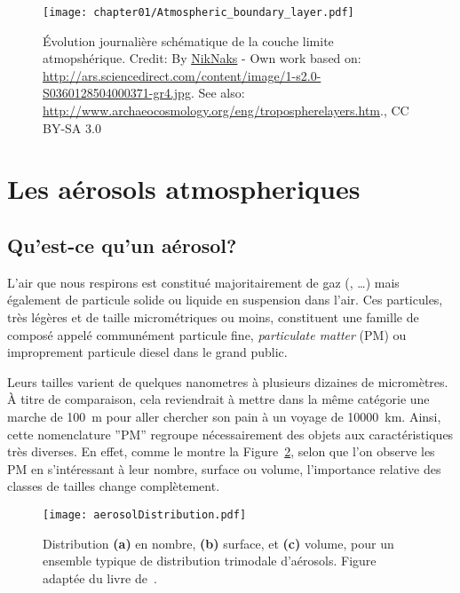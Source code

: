 \begin{figure}[h]
    \centering
    \texttt{[image: chapter01/Atmospheric\_boundary\_layer.pdf]}
    \caption{Évolution journalière schématique de la couche limite atmopshérique.
        Credit: By
        \href{https://commons.wikimedia.org/w/index.php?curid=18862904}{NikNaks} - Own
        work based on:
        \url{http://ars.sciencedirect.com/content/image/1-s2.0-S0360128504000371-gr4.jpg}.
        See also: \url{http://www.archaeocosmology.org/eng/tropospherelayers.htm}., CC
        BY-SA 3.0
    }%
    \label{fig:chapter01/Atmospheric_boundary_layer}
\end{figure}


\section{Les aérosols atmospheriques}%
\label{sec:les_aerosols_atmospheriques}

\subsection{Qu'est-ce qu'un aérosol?}%
\label{sub:quest-ce-quun-aerosol}

L'air que nous respirons est constitué majoritairement de gaz (, …) mais
également de particule solide ou liquide en suspension dans l'air. Ces particules, très
légères et de taille micrométriques ou moins, constituent une famille de composé appelé
communément particule fine, \textit{particulate matter} (PM) ou improprement particule
diesel dans le grand public.

Leurs tailles varient de quelques nanometres à plusieurs dizaines de micromètres.
À titre de comparaison, cela reviendrait à mettre dans la même catégorie une marche de
\SI{100}{m} pour aller chercher son pain à un voyage de \SI{10000}{km}.
Ainsi, cette nomenclature ''PM'' regroupe nécessairement des objets aux caractéristiques
très diverses. En effet, comme le montre la Figure~\ref{fig:aerosolDistribution}, selon
que l'on observe les PM en s'intéressant à leur nombre, surface ou volume, l'importance
relative des classes de tailles change complètement.
\begin{figure}[ht]
    \centering
    \texttt{[image: aerosolDistribution.pdf]}
    \caption{Distribution \textbf{(a)} en nombre, \textbf{(b)} surface, et
        \textbf{(c)} volume, pour un ensemble typique de distribution trimodale
        d'aérosols. Figure adaptée du livre de~\textcite{seinfieldAtmospheric1998}.}
    \label{fig:aerosolDistribution}
\end{figure}


